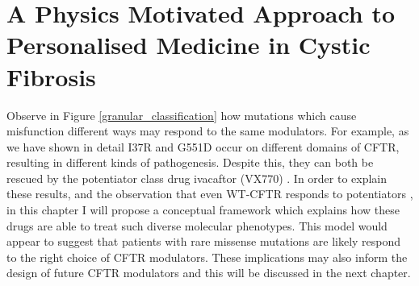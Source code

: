 \section{A Physics Motivated Approach to Personalised Medicine in Cystic Fibrosis}
Observe in Figure \ref{granular_classification} how mutations which cause misfunction different ways may respond to the same modulators. For example, as we have shown in detail I37R and G551D occur on different domains of CFTR, resulting in different kinds of pathogenesis. Despite this, they can both be rescued by the potentiator class drug ivacaftor (VX770) \cite{vangoor2014,wong2022}. In order to explain these results, and the observation that even WT-CFTR responds to potentiators \cite{csanady2019}, in this chapter I will propose a conceptual framework which explains how these drugs are able to treat such diverse molecular phenotypes. This model would appear to suggest that patients with rare missense mutations are likely respond to the right choice of CFTR modulators. These implications may also inform the design of future CFTR modulators and this will be discussed in the next chapter. 

